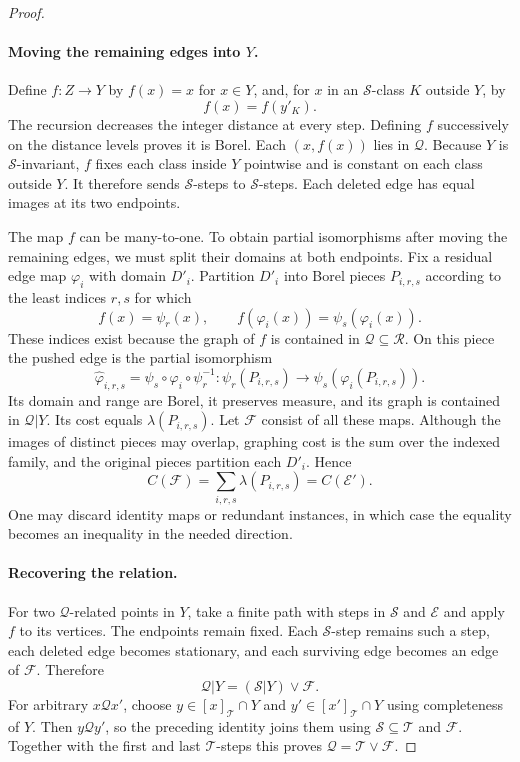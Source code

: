 \begin{proof}
\paragraph{Moving the remaining edges into $Y$.}
Define $f:Z\to Y$ by $f(x)=x$ for $x\in Y$, and, for $x$ in an
$\mathcal S$-class $K$ outside $Y$, by
\[
 f(x)=f(y'_K).
\]
The recursion decreases the integer distance at every step.  Defining
$f$ successively on the distance levels proves it is Borel.  Each
$(x,f(x))$ lies in $\mathcal Q$.  Because $Y$ is
$\mathcal S$-invariant, $f$ fixes each class inside $Y$ pointwise and
is constant on each class outside $Y$.  It therefore sends
$\mathcal S$-steps to $\mathcal S$-steps.  Each deleted edge has equal
images at its two endpoints.

The map $f$ can be many-to-one.  To obtain partial isomorphisms after
moving the remaining edges, we must split their domains at both
endpoints.  Fix a residual edge map $\varphi_i$ with domain $D'_i$.
Partition $D'_i$ into Borel pieces $P_{i,r,s}$ according to the least
indices $r,s$ for which
\[
 f(x)=\psi_r(x),\qquad
 f(\varphi_i(x))=\psi_s(\varphi_i(x)).
\]
These indices exist because the graph of $f$ is contained in
$\mathcal Q\subseteq\mathcal R$.  On this piece the pushed edge is
the partial isomorphism
\[
 \widehat\varphi_{i,r,s}
 =\psi_s\circ\varphi_i\circ\psi_r^{-1}:
 \psi_r(P_{i,r,s})\longrightarrow
 \psi_s(\varphi_i(P_{i,r,s})).
\]
Its domain and range are Borel, it preserves measure, and its graph is
contained in $\mathcal Q|Y$.  Its cost equals
$\lambda(P_{i,r,s})$.  Let $\mathcal F$ consist of all these maps.
Although the images of distinct pieces may overlap, graphing cost is
the sum over the indexed family, and the original pieces partition
each $D'_i$.  Hence
\begin{equation}\label{compression:pushed-cost}
 C(\mathcal F)=\sum_{i,r,s}\lambda(P_{i,r,s})=C(\mathcal E').
\end{equation}
One may discard identity maps or redundant instances, in which case
the equality becomes an inequality in the needed direction.

\paragraph{Recovering the relation.}
For two $\mathcal Q$-related points in $Y$, take a finite path with
steps in $\mathcal S$ and $\mathcal E$ and apply $f$ to its vertices.
The endpoints remain fixed.  Each $\mathcal S$-step remains such a
step, each deleted edge becomes stationary, and each surviving edge
becomes an edge of $\mathcal F$.  Therefore
\[
 \mathcal Q|Y=(\mathcal S|Y)\vee\mathcal F.
\]
For arbitrary $x\mathrel{\mathcal Q}x'$, choose
$y\in[x]_{\mathcal T}\cap Y$ and
$y'\in[x']_{\mathcal T}\cap Y$ using completeness of $Y$.
Then $y\mathrel{\mathcal Q}y'$, so the preceding identity joins them
using $\mathcal S\subseteq\mathcal T$ and $\mathcal F$.
Together with the first and last $\mathcal T$-steps this proves
$\mathcal Q=\mathcal T\vee\mathcal F$.


\end{proof}
